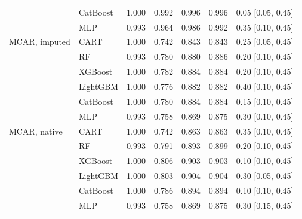 \begin{table}[p]
\begin{tabular}{@{}llrrrrl@{}}
 & CatBoost & 1.000 & 0.992 & 0.996 & 0.996 & 0.05 [0.05, 0.45] \\
 & MLP & 0.993 & 0.964 & 0.986 & 0.992 & 0.35 [0.10, 0.45] \\
\midrule
MCAR, imputed & CART & 1.000 & 0.742 & 0.843 & 0.843 & 0.25 [0.05, 0.45] \\
 & RF & 0.993 & 0.780 & 0.880 & 0.886 & 0.20 [0.10, 0.45] \\
 & XGBoost & 1.000 & 0.782 & 0.884 & 0.884 & 0.20 [0.10, 0.45] \\
 & LightGBM & 1.000 & 0.776 & 0.882 & 0.882 & 0.40 [0.10, 0.45] \\
 & CatBoost & 1.000 & 0.780 & 0.884 & 0.884 & 0.15 [0.10, 0.45] \\
 & MLP & 0.993 & 0.758 & 0.869 & 0.875 & 0.30 [0.10, 0.45] \\
\midrule
MCAR, native & CART & 1.000 & 0.742 & 0.863 & 0.863 & 0.35 [0.10, 0.45] \\
 & RF & 0.993 & 0.791 & 0.893 & 0.899 & 0.20 [0.10, 0.45] \\
 & XGBoost & 1.000 & 0.806 & 0.903 & 0.903 & 0.10 [0.10, 0.45] \\
 & LightGBM & 1.000 & 0.803 & 0.904 & 0.904 & 0.30 [0.05, 0.45] \\
 & CatBoost & 1.000 & 0.786 & 0.894 & 0.894 & 0.10 [0.10, 0.45] \\
 & MLP & 0.993 & 0.758 & 0.869 & 0.875 & 0.30 [0.15, 0.45] \\
\bottomrule
\end{tabular}
\end{table}

